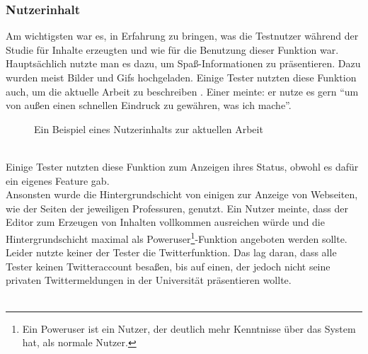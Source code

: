 \subsubsection{Nutzerinhalt}\label{Nutzerinhalt}
Am wichtigsten war es, in Erfahrung zu bringen, was die Testnutzer während der Studie für Inhalte erzeugten und wie für die Benutzung dieser Funktion war.
Hauptsächlich nutzte man es dazu, um Spaß-Informationen zu präsentieren.
Dazu wurden meist Bilder und Gifs hochgeladen.
Einige Tester nutzten diese Funktion auch, um die aktuelle Arbeit zu beschreiben .
Einer meinte: er nutze es gern ``um von außen einen schnellen Eindruck zu gewähren, was ich mache''.
\begin{figure}[h!]
  \centering
  \caption{Ein Beispiel eines Nutzerinhalts zur aktuellen Arbeit}
  \label{img:StudieExampleContent}
\end{figure}
\\
Einige Tester nutzten diese Funktion zum Anzeigen ihres Status, obwohl es dafür ein eigenes Feature gab.
\\
Ansonsten wurde die Hintergrundschicht von einigen zur Anzeige von Webseiten, wie der Seiten der jeweiligen Professuren, genutzt.
Ein Nutzer meinte, dass der Editor zum Erzeugen von Inhalten vollkommen ausreichen würde und die Hintergrundschicht maximal als Poweruser\footnote{Ein Poweruser ist ein Nutzer, der deutlich mehr Kenntnisse über das System hat, als normale Nutzer.}-Funktion angeboten werden sollte.
\\
Leider nutzte keiner der Tester die Twitterfunktion.
Das lag daran, dass alle Tester keinen Twitteraccount besaßen, bis auf einen, der jedoch nicht seine privaten Twittermeldungen in der Universität präsentieren wollte.
\\
\\
